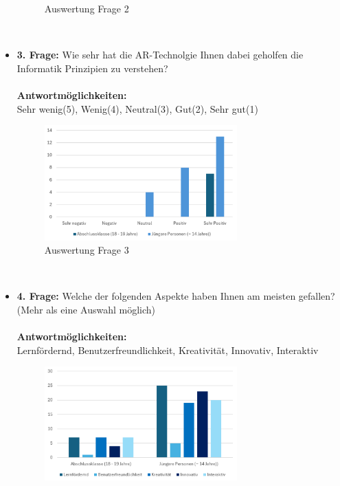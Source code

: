 \begin{itemize}
\begin{figure}[H]
        \caption{Auswertung Frage 2}
        \label{fig:fr2}
    \end{figure}
    \\
    \item \textbf{3. Frage:} Wie sehr hat die AR-Technolgie Ihnen dabei geholfen die Informatik Prinzipien zu verstehen?
    \\
    \\
    \textbf{Antwortmöglichkeiten:}\\
    Sehr wenig(5), Wenig(4), Neutral(3), Gut(2), Sehr gut(1)
    \\
    \begin{figure}[H]
        \centering
        \includegraphics[width=0.7\textwidth]{images/AuswertungFrage3}
        \caption{Auswertung Frage 3}
        \label{fig:fr3}
    \end{figure}
    \\
    \item \textbf{4. Frage:} Welche der folgenden Aspekte haben Ihnen am meisten gefallen? (Mehr als eine Auswahl möglich)
    \\
    \\
    \textbf{Antwortmöglichkeiten:}\\
    Lernfördernd, Benutzerfreundlichkeit, Kreativität, Innovativ, Interaktiv
    \\
    \begin{figure}[H]
        \centering
        \includegraphics[width=0.7\textwidth]{images/AuswertungFrage4}

\end{figure}
\end{itemize}
